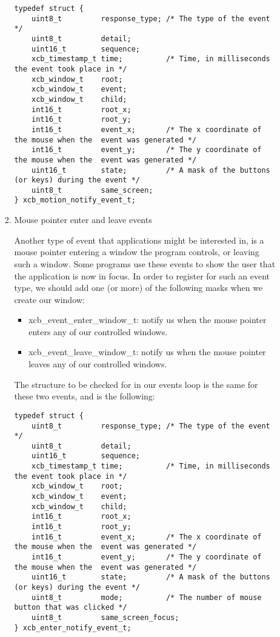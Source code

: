 \documentclass[12pt,oneside,titlepage]{book}
\providecommand{\tightlist}{%
  \setlength{\itemsep}{0pt}\setlength{\parskip}{0pt}}
\begin{document}
\begin{enumerate}
\begin{enumerate}
\begin{enumerate}
\begin{verbatim}
typedef struct {
    uint8_t         response_type; /* The type of the event */
    uint8_t         detail;
    uint16_t        sequence;
    xcb_timestamp_t time;          /* Time, in milliseconds the event took place in */
    xcb_window_t    root;
    xcb_window_t    event;
    xcb_window_t    child;
    int16_t         root_x;
    int16_t         root_y;
    int16_t         event_x;       /* The x coordinate of the mouse when the  event was generated */
    int16_t         event_y;       /* The y coordinate of the mouse when the  event was generated */
    uint16_t        state;         /* A mask of the buttons (or keys) during the event */
    uint8_t         same_screen;
} xcb_motion_notify_event_t;
\end{verbatim}
    \item
      \protect\hypertarget{mouseenter}{}{Mouse pointer enter and leave
      events}

      Another type of event that applications might be interested in, is
      a mouse pointer entering a window the program controls, or leaving
      such a window. Some programs use these events to show the user
      that the application is now in focus. In order to register for
      such an event type, we should add one (or more) of the following
      masks when we create our window:

      \begin{itemize}
      \tightlist
      \item
        {xcb\_event\_enter\_window\_t}: notify us when the mouse pointer
        enters any of our controlled windows.
      \item
        {xcb\_event\_leave\_window\_t}: notify us when the mouse pointer
        leaves any of our controlled windows.
      \end{itemize}

      The structure to be checked for in our events loop is the same for
      these two events, and is the following:

\begin{verbatim}
typedef struct {
    uint8_t         response_type; /* The type of the event */
    uint8_t         detail;
    uint16_t        sequence;
    xcb_timestamp_t time;          /* Time, in milliseconds the event took place in */
    xcb_window_t    root;
    xcb_window_t    event;
    xcb_window_t    child;
    int16_t         root_x;
    int16_t         root_y;
    int16_t         event_x;       /* The x coordinate of the mouse when the  event was generated */
    int16_t         event_y;       /* The y coordinate of the mouse when the  event was generated */
    uint16_t        state;         /* A mask of the buttons (or keys) during the event */
    uint8_t         mode;          /* The number of mouse button that was clicked */
    uint8_t         same_screen_focus;
} xcb_enter_notify_event_t;


\end{verbatim}
\end{enumerate}
\end{enumerate}
\end{enumerate}
\end{document}
